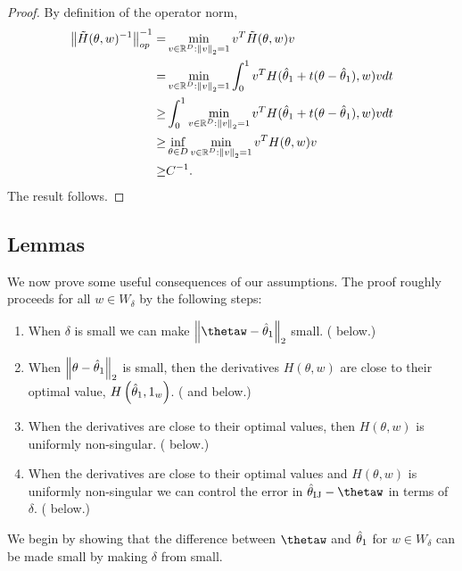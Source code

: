 \begin{proof}
%
By definition of the operator norm,
%
\begin{align*}
\left\Vert \tilde{H}(\theta, w)^{-1}\right\Vert_{op}^{-1} =&
    \min_{v \in \mathbb{R}^D: \left\Vert v\right\Vert_2 = 1} v^T \tilde{H}(\theta, w) v \\
=& \min_{v \in \mathbb{R}^D: \left\Vert v\right\Vert_2 = 1}
    \int_0^1 v^T H(\hat{\theta}_{1} + t (\theta - \hat{\theta}_{1}), w) v dt \\
\ge& \int_0^1 \min_{v \in \mathbb{R}^D: \left\Vert v\right\Vert_2 = 1}
    v^T H(\hat{\theta}_{1} + t (\theta - \hat{\theta}_{1}), w) v dt \\
\ge& \inf_{\theta \in D} \min_{v \in \mathbb{R}^D: \left\Vert v\right\Vert_2 = 1}
        v^T H(\theta, w) v \\
\ge& C^{-1}.
\end{align*}
%
The result follows.
%
\end{proof}






\subsection{Lemmas}

We now prove some useful consequences of our assumptions. The proof
roughly proceeds for all $w\in W_{\delta}$ by the following steps:
%
\begin{enumerate}
\item When $\delta$ is small we can make $\norm{{{\thetaw}}-\thetaone}_{2}$
small. ( below.)
\item When $\left\Vert \theta-\hat{\theta}_{1}\right\Vert_{2}$ is small, then the derivatives
$H\left(\theta,w\right)$ are close to their optimal value, $H\left(\hat{\theta}_{1},1_{w}\right)$.
( and 
below.)
\item When the derivatives are close to their optimal values, then $H\left(\theta,w\right)$
is uniformly non-singular. ( below.)
\item When the derivatives are close to their optimal values and $H\left(\theta,w\right)$
is uniformly non-singular we can control the error in $\thetaij-\thetaw$
in terms of $\delta$. ( below.)
\end{enumerate}
%
We begin by showing that the difference between $\thetaw$ and $\hat{\theta}_{1}$
for $w\in W_{\delta}$ can be made small by making $\delta$ from
 small.

